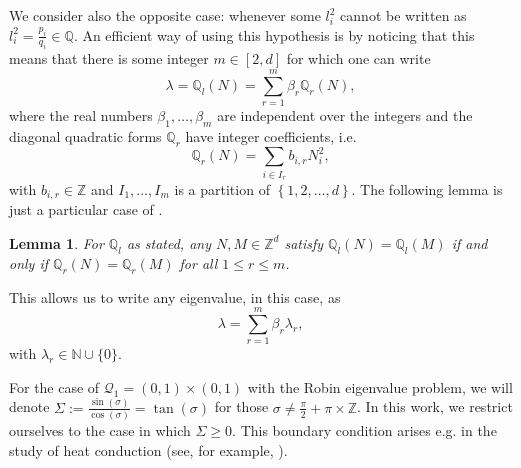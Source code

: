 \documentclass{amsart}
\newtheorem{lemma}[theorem]{Lemma}
\theoremstyle{definition}
\theoremstyle{remark}
\renewcommand\leq\leqslant
\renewcommand\geq\geqslant
\numberwithin{equation}{section}
\theoremstyle{definition}
\theoremstyle{remark}
\begin{document}
We consider also the opposite case: whenever some $l_i^2$ cannot be written as $l_i^2= \frac{p_i}{q_i}\in\mathbb{Q}$. An efficient way of using this hypothesis is by noticing that this means that there is some integer $m\in\left[2,d\right]$ for which one can write \begin{equation}\label{irrationalsquare}
	\lambda=\mathbb{Q}_l\left(N\right)=\sum_{r=1}^m\beta_r\mathbb{Q}_r\left(N\right),
\end{equation}where the real numbers $\beta_1,\ldots,\beta_m$ are independent over the integers and the diagonal quadratic forms $\mathbb{Q}_r$ have integer coefficients, i.e. \begin{equation}
	\mathbb{Q}_r\left(N\right)=\sum_{i\in I_r}b_{i,r}N_i^2,
\end{equation}with $b_{i,r}\in\mathbb{Z}$ and $I_1,\ldots,I_m$ is a partition of $\left\{1,2,\ldots,d\right\}$. The following lemma is just a particular case of \cite[Lemma 4.2]{ILtori}.\begin{lemma}\label{independence}
	For $\mathbb{Q}_l$ as stated, any $N,M\in\mathbb{Z}^d$ satisfy $\mathbb{Q}_l(N)=\mathbb{Q}_l(M)$ if and only if $\mathbb{Q}_r(N)=\mathbb{Q}_r(M)$ for all $1\leq r\leq m$.
\end{lemma}This allows us to write any eigenvalue, in this case, as\begin{equation}
	\lambda=\sum_{r=1}^m\beta_r\lambda_r,\end{equation}with $\lambda_r\in\mathbb{N}\cup\{0\}$.

For the case of $\mathcal{Q}_1=(0,1)\times(0,1)$ with the Robin eigenvalue problem, we will denote $\Sigma:=\frac{\sin(\sigma)}{\cos(\sigma)}=\tan(\sigma)$ for  those $\sigma\neq \frac{\pi}{2}+\pi\times\mathbb{Z}$. In this work, we restrict ourselves to the case in which $\Sigma\geq0$. This boundary condition arises e.g. in the study of heat conduction (see, for example, \cite[Chapter 1]{heatconduction}).
\end{document}
